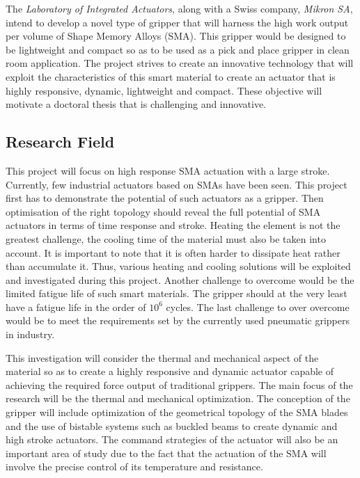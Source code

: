 The \emph{Laboratory of Integrated Actuators}, along with a Swiss company, \emph{Mikron SA}, intend to develop a novel type of gripper that will harness the high work output per volume of Shape Memory Alloys (SMA). This gripper would be designed to be lightweight and compact so as to be used as a pick and place gripper in clean room application. The project strives to create an innovative technology that will exploit the characteristics of this smart material to create an actuator that is highly responsive, dynamic, lightweight and compact. These objective will motivate a doctoral thesis that is challenging and innovative.

\subsection{Research Field}\label{subsec:research_field}
This project will focus on high response SMA actuation with a large stroke. Currently, few industrial actuators based on SMAs have been seen. This project first has to demonstrate the potential of such actuators as a gripper. Then optimisation of the right topology should reveal the full potential of SMA actuators in terms of time response and stroke. Heating the element is not the greatest challenge, the cooling time of the material must also be taken into account. It is important to note that it is often harder to dissipate heat rather than accumulate it. Thus, various heating and cooling solutions will be exploited and investigated during this project. Another challenge to overcome would be the limited fatigue life of such smart materials. The gripper should at the very least have a fatigue life in the order of $10^6$ cycles. The last challenge to over overcome would be to meet the requirements set by the currently used pneumatic grippers in industry.

This investigation will consider the thermal and mechanical aspect of the material so as to create a highly responsive and dynamic actuator capable of achieving the required force output of traditional grippers. The main focus of the research will be the thermal and mechanical optimization. The conception of the gripper will include optimization of the geometrical topology of the SMA blades and the use of bistable systems such as buckled beams to create dynamic and high stroke actuators. The command strategies of the actuator will also be an important area of study due to the fact that the actuation of the SMA will involve the precise control of its temperature and resistance.

